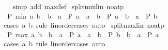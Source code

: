 \begin{isabellebody}
%
\isadelimproof
\ \ %
\endisadelimproof
%
\isatagproof
{}\isamarkupfalse%
\ {\isacharparenleft}{\kern0pt}simp\ add{\isacharcolon}{\kern0pt}\ max{\isacharunderscore}{\kern0pt}def{\isacharparenright}{\kern0pt}%
\endisatagproof
{\isafoldproof}%
%
\isadelimproof
\isanewline
%
\endisadelimproof
\isanewline
{}\isamarkupfalse%
\ split{\isacharunderscore}{\kern0pt}min{\isacharunderscore}{\kern0pt}lin\ {\isacharbrackleft}{\kern0pt}no{\isacharunderscore}{\kern0pt}atp{\isacharbrackright}{\kern0pt}{\isacharcolon}{\kern0pt}\isanewline
\ \ {\isacartoucheopen}P\ {\isacharparenleft}{\kern0pt}min\ a\ b{\isacharparenright}{\kern0pt}\ {\isasymlongleftrightarrow}\ {\isacharparenleft}{\kern0pt}b\ {\isacharequal}{\kern0pt}\ a\ {\isasymlongrightarrow}\ P\ a{\isacharparenright}{\kern0pt}\ {\isasymand}\ {\isacharparenleft}{\kern0pt}a\ {\isacharless}{\kern0pt}\ b\ {\isasymlongrightarrow}\ P\ a{\isacharparenright}{\kern0pt}\ {\isasymand}\ {\isacharparenleft}{\kern0pt}b\ {\isacharless}{\kern0pt}\ a\ {\isasymlongrightarrow}\ P\ b{\isacharparenright}{\kern0pt}{\isacartoucheclose}\isanewline
%
\isadelimproof
\ \ %
\endisadelimproof
%
\isatagproof
{}\isamarkupfalse%
\ {\isacharparenleft}{\kern0pt}cases\ a\ b\ rule{\isacharcolon}{\kern0pt}\ linorder{\isacharunderscore}{\kern0pt}cases{\isacharparenright}{\kern0pt}\ auto%
\endisatagproof
{\isafoldproof}%
%
\isadelimproof
\isanewline
%
\endisadelimproof
\isanewline
{}\isamarkupfalse%
\ split{\isacharunderscore}{\kern0pt}max{\isacharunderscore}{\kern0pt}lin\ {\isacharbrackleft}{\kern0pt}no{\isacharunderscore}{\kern0pt}atp{\isacharbrackright}{\kern0pt}{\isacharcolon}{\kern0pt}\isanewline
\ \ {\isacartoucheopen}P\ {\isacharparenleft}{\kern0pt}max\ a\ b{\isacharparenright}{\kern0pt}\ {\isasymlongleftrightarrow}\ {\isacharparenleft}{\kern0pt}b\ {\isacharequal}{\kern0pt}\ a\ {\isasymlongrightarrow}\ P\ a{\isacharparenright}{\kern0pt}\ {\isasymand}\ {\isacharparenleft}{\kern0pt}a\ {\isacharless}{\kern0pt}\ b\ {\isasymlongrightarrow}\ P\ b{\isacharparenright}{\kern0pt}\ {\isasymand}\ {\isacharparenleft}{\kern0pt}b\ {\isacharless}{\kern0pt}\ a\ {\isasymlongrightarrow}\ P\ a{\isacharparenright}{\kern0pt}{\isacartoucheclose}\isanewline
%
\isadelimproof
\ \ %
\endisadelimproof
%
\isatagproof
{}\isamarkupfalse%
\ {\isacharparenleft}{\kern0pt}cases\ a\ b\ rule{\isacharcolon}{\kern0pt}\ linorder{\isacharunderscore}{\kern0pt}cases{\isacharparenright}{\kern0pt}\ auto%
\endisatagproof
{\isafoldproof}%
%
\isadelimproof
\isanewline
%
\endisadelimproof
\isanewline
{}\isamarkupfalse%

\end{isabellebody}
